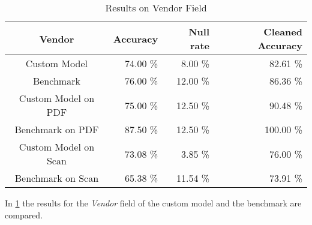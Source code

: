 \begin{table}[ht]   %
    \centering
    \footnotesize
    \begin{tabular}{c|rrr} %
        \toprule    %
        Vendor  & Accuracy  & Null rate & Cleaned Accuracy \\
        \midrule    %
        Custom Model               & 74.00 \%   & 8.00 \%   & 82.61 \% \\
        Benchmark           & 76.00 \%   & 12.00 \%  & 86.36 \%\\
        \midrule    %
        Custom Model on PDF        & 75.00 \%   & 12.50 \%  & 90.48 \% \\
        Benchmark on PDF    & 87.50 \%   & 12.50 \%  & 100.00 \% \\
        \midrule    %
        Custom Model on Scan       & 73.08 \%  & 3.85 \%   & 76.00 \% \\
        Benchmark on Scan   & 65.38 \%  & 11.54 \%  & 73.91 \% \\

        \bottomrule %
    \end{tabular}
    \caption{Results on Vendor Field}
    \label{table:Model_Bench_Vendor}
\end{table}

In \cref{table:Model_Bench_Vendor} the results for the \textit{Vendor} field of the custom model and the benchmark are compared. 

